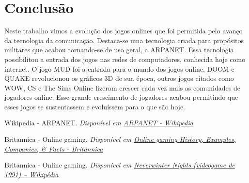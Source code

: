 \documentclass[conference]{ModeloA}
\begin{document}

\section{Conclusão}

Neste trabalho vimos a evolução dos jogos onlines que foi permitida pelo avanço da tecnologia da comunicação. Destaca-se uma tecnologia criada para propósitos militares que acabou tornando-se de uso geral, a ARPANET. Essa tecnologia possibilitou a entrada dos jogos nas redes de computadores, conhecida hoje como internet. O jogo MUD foi a entrada para o mundo dos jogos online, DOOM e QUAKE revolucionou os gráficos 3D de sua época, outros jogos citados como WOW, CS e The Sims Online fizeram crescer cada vez mais as comunidades de jogadores online. Esse grande crescimento de jogadores acabou permitindo que esses jogos se sustentassem e evoluíssem para o que são hoje.

\begin{thebibliography}{00}
	
 Wikipedia - ARPANET. {\it Disponível em \href{https://pt.wikipedia.org/wiki/ARPANET}{ARPANET - Wikipedia}}

 Britannica - Online gaming. {\it Disponível em \href{https://www.britannica.com/technology/online-gaming}{Online gaming History, Examples, Companies, & Facts - Britannica}}

 Britannica - Online gaming. {\it Disponível em \href{https://en.wikipedia.org/wiki/Neverwinter_Nights_(1991_video_game)}{Neverwinter Nights (videogame de 1991) – Wikipédia}}

\end{thebibliography}
\end{document}

